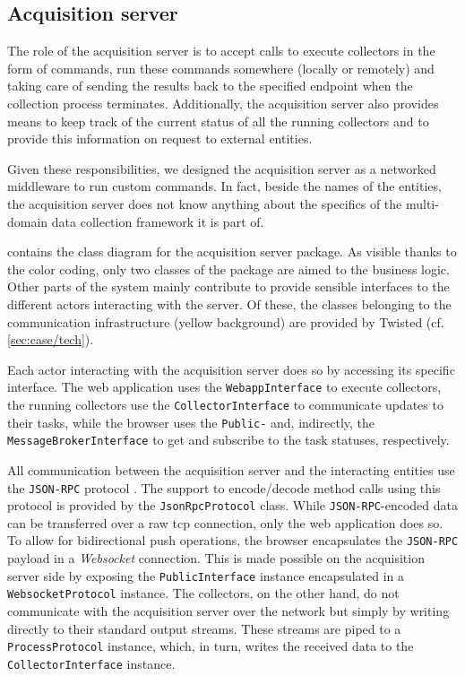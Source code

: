 \subsection{Acquisition server}
\label{sec:acquisition/design/server}

The role of the acquisition server is to accept calls to execute collectors in the form of commands, run these commands somewhere (locally or remotely) and taking care of sending the results back to the specified endpoint when the collection process terminates. Additionally, the acquisition server also provides means to keep track of the current status of all the running collectors and to provide this information on request to external entities.

Given these responsibilities, we designed the acquisition server as a networked middleware to run custom commands. In fact, beside the names of the entities, the acquisition server does not know anything about the specifics of the multi-domain data collection framework it is part of.

 contains the class diagram for the acquisition server package. As visible thanks to the color coding, only two classes of the package are aimed to the business logic. Other parts of the system mainly contribute to provide sensible interfaces to the different actors interacting with the server. Of these, the classes belonging to the communication infrastructure (yellow background) are provided by Twisted (cf. \vref{sec:case/tech}).

Each actor interacting with the acquisition server does so by accessing its specific interface. The web application uses the \texttt{WebappInterface} to execute collectors, the running collectors use the \texttt{CollectorInterface} to communicate updates to their tasks, while the browser uses the \texttt{Public-} and, indirectly, the \texttt{MessageBrokerInterface} to get and subscribe to the task statuses, respectively.

All communication between the acquisition server and the interacting entities use the \texttt{JSON-RPC} protocol \cite{jsonrpc}. The support to encode/decode method calls using this protocol is provided by the \texttt{JsonRpcProtocol} class. While \texttt{JSON-RPC}-encoded data can be transferred over a raw \gls{tcp} connection, only the web application does so. To allow for bidirectional push operations, the browser encapsulates the \texttt{JSON-RPC} payload in a \emph{Websocket} \cite{websocket} connection. This is made possible on the acquisition server side by exposing the \texttt{PublicInterface} instance encapsulated in a \texttt{WebsocketProtocol} instance. The collectors, on the other hand, do not communicate with the acquisition server over the network but simply by writing directly to their standard output streams. These streams are piped to a \texttt{ProcessProtocol} instance, which, in turn, writes the received data to the \texttt{CollectorInterface} instance.

